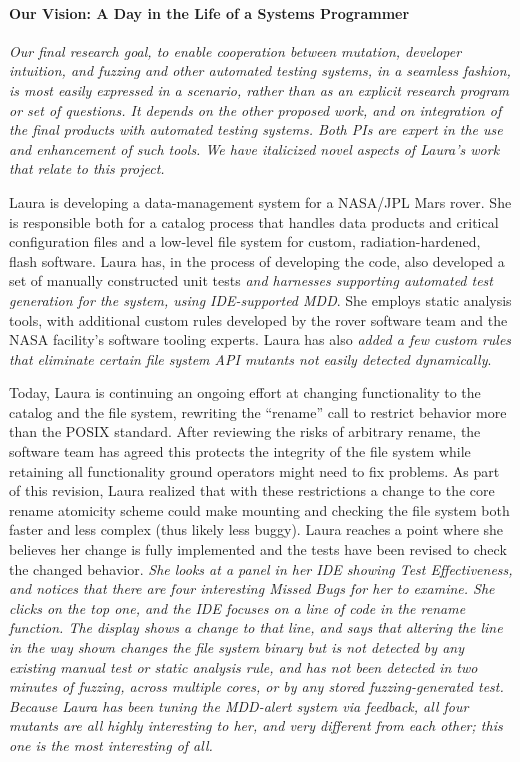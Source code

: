 \paragraph{Our Vision: A Day in the Life of a Systems Programmer}

\begin{framed} \emph{Our final research goal, to enable cooperation between mutation, developer intuition, and fuzzing and other automated testing systems, in a seamless fashion, is most easily expressed in a scenario, rather than as an explicit research program or set of questions.  It depends on the other proposed work, and on integration of the final products with automated testing systems.  Both PIs are expert in the use and enhancement of such tools.  We have italicized novel aspects of Laura's work that relate to this project.}
  \end{framed}

Laura is developing a data-management system for a NASA/JPL Mars rover.  She is responsible both for a catalog process that handles data products and critical configuration files and a low-level file system for custom, radiation-hardened, flash software.  Laura has, in the process of developing the code, also developed a set of manually constructed unit tests \emph{and harnesses supporting automated test generation for the system, using IDE-supported MDD}.  She employs static analysis tools, with additional custom rules developed by the rover software team and the NASA facility's software tooling experts.  Laura has also \emph{added a few custom rules that eliminate certain file system API mutants not easily detected dynamically}.

Today, Laura is continuing an ongoing effort at changing functionality to the catalog and the file system, rewriting the ``rename'' call to restrict behavior more than the POSIX standard.  After reviewing the risks of arbitrary rename, the software team has agreed this protects the integrity of the file system while retaining all functionality ground operators might need to fix problems.  As part of this revision, Laura realized that with these restrictions a change to the core rename atomicity scheme could make mounting and checking the file system both faster and less complex (thus likely less buggy).
Laura reaches a point where she believes her change is fully implemented and the tests have been revised to check the changed behavior.  \emph{She looks at a panel in her IDE showing Test Effectiveness, and notices that there are four interesting Missed Bugs for her to examine.  She clicks on the top one, and the IDE focuses on a line of code in the rename function.  The display shows a change to that line, and says that altering the line in the way shown changes the file system binary but is not detected by any existing manual test or static analysis rule, and has not been detected in two minutes of fuzzing, across multiple cores, or by any stored fuzzing-generated test.  Because Laura has been tuning the MDD-alert system via feedback, all four mutants are all highly interesting to her, and very different from each other; this one is the most interesting of all.}

